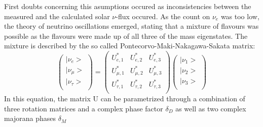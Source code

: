     \begin{equation}
    \end{equation}
    First doubts concerning this asumptions occured as inconsistencies between the measured and the calculated solar $\nu$-flux occured. As the count on $\nu_e$ was too low, the theory of neutrino oscillations emerged, stating that a mixture of flavours was possible as the flavours were made up of all three of the mass eigenstates. The mixture is described by the so called Pontecorvo-Maki-Nakagawa-Sakata matrix:
        \begin{equation}
        \left(
        \begin{array}{c}
	  |\nu_e>\\
	  |\nu_\mu>\\
	  |\nu_\tau>\\
        \end{array}
        \right)
	 = \left(
	\begin{array}{ccc}
      	U^*_{e,1} & U^*_{e,2} & U^*_{e,3}\\
      	U^*_{\mu,1} & U^*_{\mu,2} & U^*_{\mu,3}\\
      	U^*_{\tau,1} & U^*_{\tau,2} & U^*_{\tau,3}\\
      	\end{array}
	\right)
	\left(
	\begin{array}{c}
      	|\nu_1>\\
      	|\nu_2>\\
      	|\nu_3>\\
    	 \end{array}
    	 \right)
    \end{equation}
    In this equation, the matrix U can be parametrized through a combination of three rotation matrices and a complex phase factor $\delta_D$ as well as two complex majorana phases $\delta_M$
    
